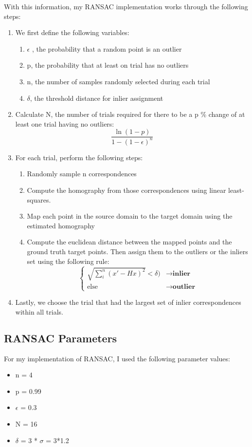 \documentclass{article}
\begin{document}
With this information, my RANSAC implementation works through the following steps:
\begin{enumerate}
    \item We first define the following variables:
        \begin{enumerate}
            \item $\epsilon$ , the probability that a random point is an outlier
            \item p, the probability that at least on trial has no outliers
            \item n, the number of samples randomly selected during each trial
            \item $\delta$, the threshold distance for inlier assignment
        \end{enumerate}
    \item Calculate N, the number of trials required for there to be a p \% change of at least one trial having no outliers: 
        \[\frac{\ln (1-p)}{1-(1-\epsilon)^{n}}\]
    \item For each trial, perform the following steps:
        \begin{enumerate}
            \item Randomly sample n correspondences
            \item Compute the homography from those correspondences using linear least-squares.
            \item Map each point in the source domain to the target domain using the estimated homography
            \item Compute the euclidean distance between the mapped points and the ground truth target points. Then assign them to the outliers or the inliers set using the following rule: 
            \[\begin{cases}
                \sqrt{\sum_i^n (x' - Hx)^2} < \delta) & \rightarrow  \textbf{inlier}\\
                \text{else} & \rightarrow  \textbf{outlier}
                \end{cases}
            \]
        \end{enumerate}
    \item Lastly, we choose the trial that had the largest set of inlier correspondences within all trials.
\end{enumerate}

\subsection{RANSAC Parameters}
For my implementation of RANSAC, I used the following parameter values:
\begin{itemize}
    \item n = 4
    \item p = 0.99
    \item $\epsilon$ = 0.3
    \item N = 16
    \item $\delta$ = 3 * $\sigma$ = 3*1.2
\end{itemize}
\end{document}
